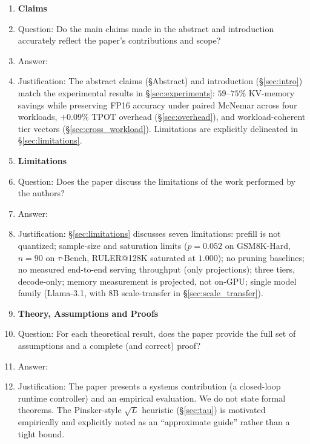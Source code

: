 \documentclass{article}
\begin{document}
\begin{enumerate}

\item {\bf Claims}
\item[] Question: Do the main claims made in the abstract and introduction accurately reflect the paper's contributions and scope?
\item[] Answer: \answerYes{}
\item[] Justification: The abstract claims (\S Abstract) and introduction (\S\ref{sec:intro}) match the experimental results in \S\ref{sec:experiments}: $59$--$75\%$ KV-memory savings while preserving FP16 accuracy under paired McNemar across four workloads, $+0.09\%$ TPOT overhead (\S\ref{sec:overhead}), and workload-coherent tier vectors (\S\ref{sec:cross_workload}). Limitations are explicitly delineated in \S\ref{sec:limitations}.

\item {\bf Limitations}
\item[] Question: Does the paper discuss the limitations of the work performed by the authors?
\item[] Answer: \answerYes{}
\item[] Justification: \S\ref{sec:limitations} discusses seven limitations: prefill is not quantized; sample-size and saturation limits ($p{=}0.052$ on GSM8K-Hard, $n{=}90$ on $\tau$-Bench, RULER@128K saturated at $1.000$); no pruning baselines; no measured end-to-end serving throughput (only projections); three tiers, decode-only; memory measurement is projected, not on-GPU; single model family (Llama-3.1, with 8B scale-transfer in \S\ref{sec:scale_transfer}).

\item {\bf Theory, Assumptions and Proofs}
\item[] Question: For each theoretical result, does the paper provide the full set of assumptions and a complete (and correct) proof?
\item[] Answer: \answerNA{}
\item[] Justification: The paper presents a systems contribution (a closed-loop runtime controller) and an empirical evaluation. We do not state formal theorems. The Pinsker-style $\sqrt{L}$ heuristic (\S\ref{sec:tau}) is motivated empirically and explicitly noted as an ``approximate guide'' rather than a tight bound.


\end{enumerate}
\end{document}
